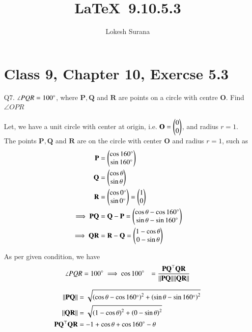 \documentclass[journal,12pt,twocolumn]{IEEEtran}
\let\vec\mathbf
\begin{document}
\vspace{3cm}
\title{\LaTeX\ 9.10.5.3}
\author{Lokesh Surana}
\maketitle
\section*{Class 9, Chapter 10, Exercse 5.3}

Q7. $\angle{PQR} = 100\degree$, where $\vec{P}, \vec{Q}$ and $\vec{R}$ are points on a circle with centre $\vec{O}$. Find $\angle{OPR}$

\solution 
Let, we have a unit circle with center at origin, i.e. $\vec{O} = \myvec{0\\0}$, and radius $r = 1$.
The points $\vec{P}, \vec{Q}$ and $\vec{R}$ are on the circle with center $\vec{O}$ and radius $r = 1$, such as
\begin{align}
    \vec{P} &= \myvec{\cos160\degree\\\sin160\degree} \\
    \vec{Q} &= \myvec{\cos\theta\\\sin\theta}  \\
    \vec{R} &= \myvec{\cos0\degree \\ \sin0\degree} = \myvec{1 \\ 0} \\
    \implies \vec{PQ} &= \vec{Q} - \vec{P} = \myvec{\cos\theta - \cos160\degree \\ \sin\theta - \sin160\degree} \\
    \implies \vec{QR} &= \vec{R} - \vec{Q} = \myvec{1 - \cos\theta \\ 0 - \sin\theta} 
\end{align}

As per given condition, we have
\begin{align}
    \angle{PQR} &= 100\degree 
    \label{eq:1} \implies \cos100\degree &= \frac{\vec{PQ}^\top \vec{QR}}{\norm{\vec{PQ}} \norm{\vec{QR}}} \\
\end{align}

\begin{align}
    \label{eq:2}   \norm{\vec{PQ}} &= \sqrt{\brak{\cos\theta - \cos160\degree}^2 + \brak{\sin\theta - \sin160\degree}^2} \\
    \label{eq:3}    \norm{\vec{QR}} &= \sqrt{\brak{1 - \cos\theta}^2 + \brak{0 - \sin\theta}^2} \\
    \label{eq:4}    \vec{PQ}^\top \vec{QR} &= -1 + \cos\theta + \cos{160\degree - \theta}
\end{align}
\end{document}
